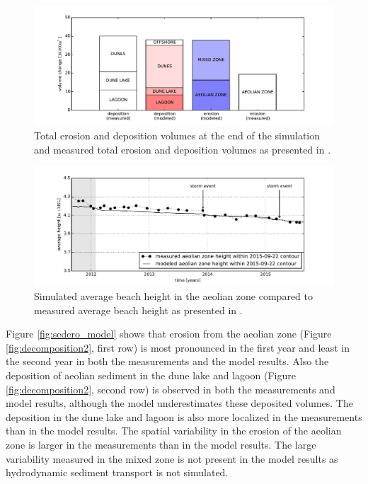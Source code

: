 \begin{figure}
  \centering
  \includegraphics[width=\columnwidth]{../Figures/model_volumes}
  \caption{Total erosion and deposition volumes at the end of the
    simulation and measured total erosion and deposition volumes as
    presented in \citet{Hoonhout2017a}.}
  \label{fig:volumes_bars_model}
\end{figure}

\begin{figure}
  \centering
  \includegraphics[width=\columnwidth]{../Figures/model_heights}
  \caption{Simulated average beach height in the aeolian zone compared
    to measured average beach height as presented in
    \citet{Hoonhout2017a}.}
  \label{fig:heights_model}
\end{figure}

Figure \ref{fig:sedero_model} shows that erosion from the aeolian zone
(Figure \ref{fig:decomposition2}, first row) is most pronounced in the
first year and least in the second year in both the measurements and
the model results. Also the deposition of aeolian sediment in the dune
lake and lagoon (Figure \ref{fig:decomposition2}, second row) is
observed in both the measurements and model results, although the
model underestimates these deposited volumes. The deposition in the
dune lake and lagoon is also more localized in the measurements than
in the model results. The spatial variability in the erosion of the
aeolian zone is larger in the measurements than in the model
results. The large variability measured in the mixed zone is not
present in the model results as hydrodynamic sediment transport is not
simulated.

